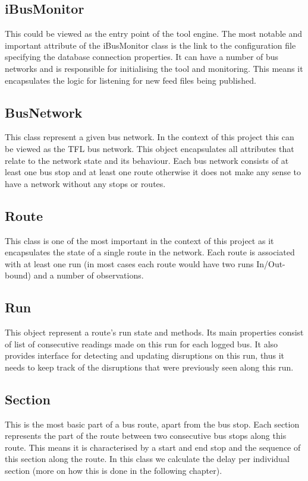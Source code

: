 \subsection{iBusMonitor}
This could be viewed as the entry point of the tool engine. The most notable and important attribute of the iBusMonitor class is the link to the configuration file specifying the database connection properties. It can have a number of bus networks and is responsible for initialising the tool and monitoring. This means it encapsulates the logic for listening for new feed files being published.

\subsection{BusNetwork}
This class represent a given bus network. In the context of this project this can be viewed as the TFL bus network. This object encapsulates all attributes that relate to the network state and its behaviour. Each bus network consists of at least one bus stop and at least one route otherwise it does not make any sense to have a network without any stops or routes.

\subsection{Route}
This class is one of the most important in the context of this project as it encapsulates the state of a single route in the network. Each route is associated with at least one run (in most cases each route would have two runs In/Out-bound) and a number of observations. 

\subsection{Run}
This object represent a route's run state and methods. Its main properties consist of list of consecutive readings made on this run for each logged bus. It also provides interface for detecting and updating disruptions on this run, thus it needs to keep track of the disruptions that were previously seen along this run.

\subsection{Section}
This is the most basic part of a bus route, apart from the bus stop. Each section represents the part of the route between two consecutive bus stops along this route. This means it is characterised by a start and end stop and the sequence of this section along the route. In this class we calculate the delay per individual section (more on how this is done in the following chapter).

